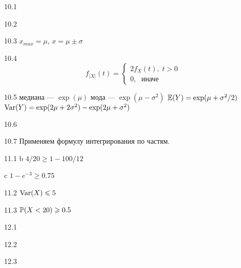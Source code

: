 \protect \hypertarget {soln:10.1}{}
\begin{solution}{{10.1}}
\end{solution}
\protect \hypertarget {soln:10.2}{}
\begin{solution}{{10.2}}
\end{solution}
\protect \hypertarget {soln:10.3}{}
\begin{solution}{{10.3}}
$x_{max}=\mu$, $x=\mu \pm \sigma$
\end{solution}
\protect \hypertarget {soln:10.4}{}
\begin{solution}{{10.4}}
  \[
  f_{|X|}(t) =
  \begin{cases}
  2f_X(t), \; t>0 \\
  0, \; \text{ иначе }
  \end{cases}
  \]
\end{solution}
\protect \hypertarget {soln:10.5}{}
\begin{solution}{{10.5}}
  медиана — $\exp(\mu)$
  мода — $\exp(\mu - \sigma^2)$
  $\E(Y)=\exp(\mu+\sigma^2/2)$
  $\Var(Y)=\exp(2\mu + 2\sigma^2)-\exp(2\mu + \sigma^2)$

\end{solution}
\protect \hypertarget {soln:10.6}{}
\begin{solution}{{10.6}}
\end{solution}
\protect \hypertarget {soln:10.7}{}
\begin{solution}{{10.7}}
  Применяем формулу интегрирования по частям.
\end{solution}
\protect \hypertarget {soln:11.1}{}
\begin{solution}{{11.1}}
  b $4/20\geq 1-100/12$

  c $1-e^{-3}\geq 0.75$
\end{solution}
\protect \hypertarget {soln:11.2}{}
\begin{solution}{{11.2}}
  $\Var(X)\leq 5$
\end{solution}
\protect \hypertarget {soln:11.3}{}
\begin{solution}{{11.3}}
  $\P(X<20) \geq 0.5$
\end{solution}
\protect \hypertarget {soln:12.1}{}
\begin{solution}{{12.1}}
\end{solution}
\protect \hypertarget {soln:12.2}{}
\begin{solution}{{12.2}}
\end{solution}
\protect \hypertarget {soln:12.3}{}
\begin{solution}{{12.3}}
\end{solution}

